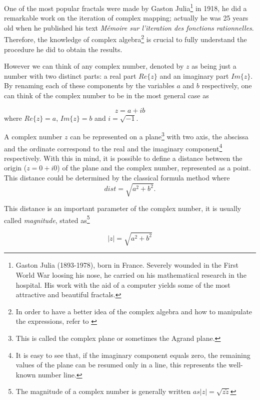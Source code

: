 \documentclass{article}
\begin{document}
One of the most popular fractals were made by Gaston Julia\footnote{Gaston Julia (1893-1978), born in France. Severely wounded in the First World War loosing his nose, he carried on his mathematical research in the hospital. His work with the aid of a computer yields some of the most attractive and beautiful fractals.} in 1918, he did a remarkable work on the iteration of complex mapping; actually he was 25 years old when he published his text \textit{Mémoire  sur  l’iteration  des  fonctions  rationnelles}\cite{PJS}. Therefore, the knowledge of complex algebra\footnote{In order to have a better idea of the complex algebra and how to manipulate the expressions, refer to \cite{wolfram}} is crucial to fully understand the procedure he did to obtain the results.

However we can think of any complex number, denoted by $z$ as being just a number with two distinct parts: a real part $Re\{z\}$ and an imaginary part $Im\{z\}$. By renaming each of these components by the variables $a$ and $b$ respectively, one can think of the complex number to be in the most general case as

\begin{equation}
    z=a+ib
\end{equation} where $Re\{z\} = a$, $Im\{z\} = b$ and $i=\sqrt{-1}$.

 A complex number $z$ can be represented on a plane\footnote{This is called the complex plane or sometimes the Agrand plane.} with two axis, the abscissa and the ordinate correspond to the real and the imaginary component\footnote{It is easy to see that, if the imaginary component equals zero, the remaining values of the plane can be resumed only in a line, this represents the well-known number line.} respectively. With this in mind, it is possible to define a distance between the origin ($z=0+i0$) of the plane and the complex number, represented as a point. This distance could be determined by the classical formula method where
\begin{equation}
    dist = \sqrt{a^2 + b^2}.
\end{equation}

This distance is an important parameter of the complex number, it is usually called \textit{magnitude}, stated as\footnote{The magnitude of a complex number is generally written $as |z| =\sqrt{z\tilde{z}} $} 

\begin{equation}
    |z| = \sqrt{a^2 + b^2}
\end{equation}
\end{document}
